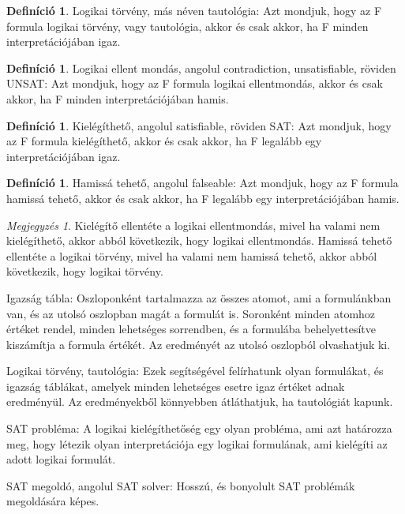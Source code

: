 \documentclass[
]{thesis-ekf}
\theoremstyle{definition}
\newtheorem{definicio}[tetel]{Definíció}
\theoremstyle{remark}
\newtheorem{megjegyzes}[tetel]{Megjegyzés}
\begin{document}
	\begin{definicio}\label{tautologia}
		Logikai törvény, más néven tautológia: Azt mondjuk, hogy az F formula logikai törvény, vagy tautológia, akkor és csak akkor, ha F minden interpretációjában igaz.
	\end{definicio}

	\begin{definicio}
		Logikai ellent mondás, angolul contradiction, unsatisfiable, röviden UNSAT: Azt mondjuk, hogy az F formula logikai ellentmondás, akkor és csak akkor, ha F minden interpretációjában hamis.
	\end{definicio}

	\begin{definicio}
		Kielégíthető, angolul satisfiable, röviden SAT: Azt mondjuk, hogy az F formula kielégíthető, akkor és csak akkor, ha F legalább egy interpretációjában igaz.
	\end{definicio}

	\begin{definicio}
		Hamissá tehető, angolul falseable: Azt mondjuk, hogy az F formula hamissá tehető, akkor és csak akkor, ha F legalább egy interpretációjában hamis. 
	\end{definicio}

	\begin{megjegyzes}
		Kielégítő ellentéte a logikai ellentmondás, mivel ha valami nem kielégíthető, akkor abból következik, hogy logikai ellentmondás.
		Hamissá tehető ellentéte a logikai törvény, mivel ha valami nem hamissá tehető, akkor abból következik, hogy logikai törvény.
	\end{megjegyzes}

	Igazság tábla: Oszloponként tartalmazza az összes atomot, ami a formulánkban van, és az utolsó oszlopban magát a formulát is. Soronként minden atomhoz értéket rendel, minden lehetséges sorrendben, és a formulába behelyettesítve kiszámítja a formula értékét. Az eredményét az utolsó oszlopból olvashatjuk ki.
	
	Logikai törvény, tautológia: Ezek segítségével felírhatunk olyan formulákat, és igazság táblákat, amelyek minden lehetséges esetre igaz értéket adnak eredményül. Az eredményekből könnyebben átláthatjuk, ha tautológiát kapunk.
	
	SAT probléma: A logikai kielégíthetőség egy olyan probléma, ami azt határozza meg, hogy létezik olyan interpretációja egy logikai formulának, ami kielégíti az adott logikai formulát.
	
	SAT megoldó, angolul SAT solver: Hosszú, és bonyolult SAT problémák megoldására képes.
\end{document}
